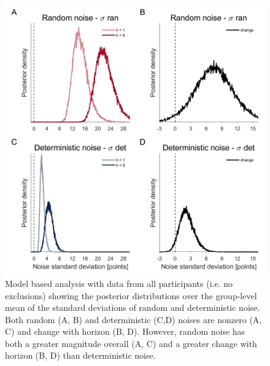 \documentclass[12pt]{article}
\begin{document}
	\begin{figure}[H]
		\begin{center}
			\includegraphics[width=1\textwidth]{figures/RDBayes_hyperprior__all.jpg}
			\caption{Model based analysis with data from all participants (i.e. no exclusions) showing the posterior distributions over the group-level mean of the standard deviations of  random and deterministic noise. Both random (A, B) and deterministic (C,D) noises are nonzero (A, C) and change with horizon (B, D).  However, random noise has both a greater magnitude overall (A, C) and a greater change with horizon (B, D) than deterministic noise.}
			\label{fig:mb12}
		\end{center}
	\end{figure}
	
\end{document}
